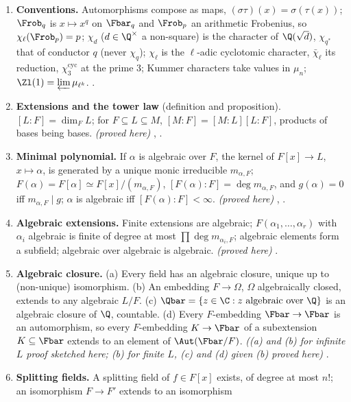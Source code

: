 \begin{enumerate}[label=\textbf{\thechapter.\arabic*}]
\item \textbf{Conventions.} Automorphisms compose as maps, $(\sigma\tau)(x)=\sigma(\tau(x))$; $\Frob_q$ is $x\mapsto x^q$ on $\Fbar_q$ and
$\Frob_p$ an arithmetic Frobenius, so $\chi_\ell(\Frob_p)=p$; $\chi_d$ ($d\in\Q^\times$ a non-square) is the character of $\Q(\sqrt d)$,
$\chi_{q^*}$ that of conductor $q$ (never $\chi_q$); $\chi_\ell$ is the $\ell$-adic cyclotomic character, $\bar\chi_\ell$ its reduction, $\chi_3^{\mathrm{cyc}}$
at the prime $3$; Kummer characters take values in $\mu_n$; $\Zl(1)=\varprojlim\mu_{\ell^k}$. .
\item \textbf{Extensions and the tower law} (definition and proposition). $[L:F]=\dim_FL$; for $F\subseteq L\subseteq M$,
$[M:F]=[M:L][L:F]$, products of bases being bases. \emph{(proved here)} , .
\item \textbf{Minimal polynomial.} If $\alpha$ is algebraic over $F$, the kernel of $F[x]\to L$, $x\mapsto\alpha$, is generated by a unique monic
irreducible $m_{\alpha,F}$; $F(\alpha)=F[\alpha]\simeq F[x]/(m_{\alpha,F})$, $[F(\alpha):F]=\deg m_{\alpha,F}$, and $g(\alpha)=0$ iff $m_{\alpha,F}\mid g$;
$\alpha$ is algebraic iff $[F(\alpha):F]<\infty$. \emph{(proved here)} , .
\item \textbf{Algebraic extensions.} Finite extensions are algebraic; $F(\alpha_1,\dots,\alpha_r)$ with $\alpha_i$ algebraic is finite of degree at most
$\prod\deg m_{\alpha_i,F}$; algebraic elements form a subfield; algebraic over algebraic is algebraic. \emph{(proved here)} .
\item \textbf{Algebraic closure.} (a) Every field has an algebraic closure, unique up to (non-unique) isomorphism. (b) An embedding $F\to\Omega$,
$\Omega$ algebraically closed, extends to any algebraic $L/F$. (c) $\Qbar=\{z\in\C:z\text{ algebraic over }\Q\}$ is an algebraic closure of $\Q$,
countable. (d) Every $F$-embedding $\Fbar\to\Fbar$ is an automorphism, so every $F$-embedding $K\to\Fbar$ of a subextension $K\subseteq\Fbar$ extends to an element of
$\Aut(\Fbar/F)$. \emph{((a) and (b) for infinite $L$ proof sketched here; (b) for finite $L$, (c) and (d) given (b) proved here)} .
\item \textbf{Splitting fields.} A splitting field of $f\in F[x]$ exists, of degree at most $n!$; an isomorphism $F\to F'$ extends to an isomorphism

\end{enumerate}
